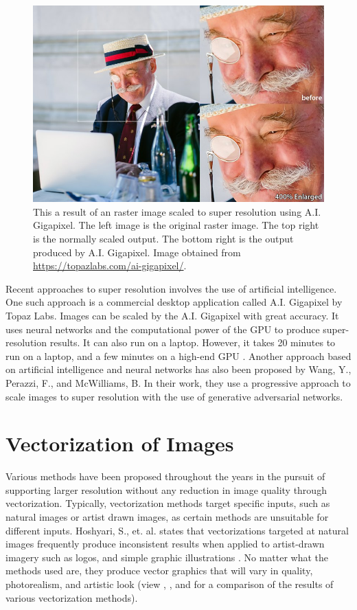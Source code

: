 \begin{figure}[h]
	\centering
	\includegraphics[scale=0.5]{images/chap02-rrl/aigigapixel-result.jpg}
	\caption{This a result of an raster image scaled to super resolution using A.I. Gigapixel. The left image is the original raster image. The top right is the normally scaled output. The bottom right is the output produced by A.I. Gigapixel. Image obtained from \protect\url{https://topazlabs.com/ai-gigapixel/}.}
	\label{fig:aigigapixel-result}
\end{figure}

Recent approaches to super resolution involves the use of artificial intelligence. One such approach is a commercial desktop application called A.I. Gigapixel by Topaz Labs. Images can be scaled by the A.I. Gigapixel with great accuracy. It uses neural networks and the computational power of the GPU to produce super-resolution results. It can also run on a laptop. However, it takes 20 minutes to run on a laptop, and a few minutes on a high-end GPU \cite{aigigapixelstory}. Another approach based on artificial intelligence and neural networks has also been proposed by Wang, Y., Perazzi, F., and McWilliams, B. In their work, they use a progressive approach to scale images to super resolution with the use of generative adversarial networks.

\section{Vectorization of Images}
Various methods have been proposed throughout the years in the pursuit of supporting larger resolution without any reduction in image quality through vectorization. Typically, vectorization methods target specific inputs, such as natural images or artist drawn images, as certain methods are unsuitable for different inputs. Hoshyari, S., et. al. states that vectorizations targeted at natural images frequently produce inconsistent results when applied to artist-drawn imagery such as logos, and simple graphic illustrations \cite{hoshyari2018perceptiondriven}. No matter what the methods used are, they produce vector graphics that will vary in quality, photorealism, and artistic look (view \cite{hierarchicaldiffusioncurves}, \cite{barendrecht2018locally}, and \cite{anovelmethodforvectorization} for a comparison of the results of various vectorization methods).

